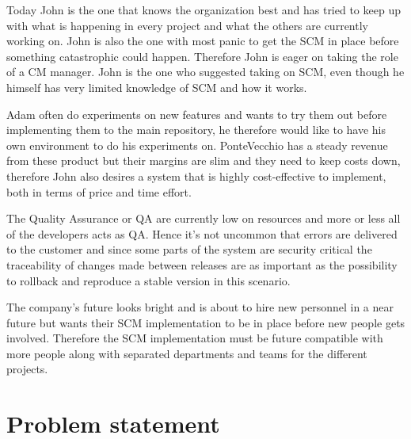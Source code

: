 \documentclass[10pt]{article}
\begin{document}
\noindent Today John is the one that knows the organization best and has tried to keep up with what is happening in every project and what the others are currently working on. John is also the one with most panic to get the SCM in place before something catastrophic could happen. Therefore John is eager on taking the role of a CM manager. John is the one who suggested taking on SCM, even though he himself has very limited knowledge of SCM and how it works.

\noindent Adam often do experiments on new features and wants to try them out before implementing them to the main repository, he therefore would like to have his own environment to do his experiments on. PonteVecchio has a steady revenue from these product but their margins are slim and they need to keep costs down, therefore John also desires a system that is highly cost-effective to implement, both in terms of price and time effort. 

\noindent The Quality Assurance or QA are currently low on resources and more or less all of the developers acts as QA. Hence it’s not uncommon that errors are delivered to the customer and since some parts of the system are security critical the traceability of changes made between releases are as important as the possibility to rollback and reproduce a stable version in this scenario.

\noindent The company's future looks bright and is about to hire new personnel in a near future but wants their SCM implementation to be in place before new people gets involved. Therefore the SCM implementation must be future compatible with more people along with separated departments and teams for the different projects.

\section{Problem statement}
\end{document}
